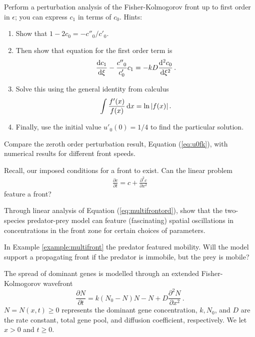 \begin{exerciseregion}

	\begin{exercise}
		Perform a perturbation analysis of the Fisher-Kolmogorov front up to first
		order in $\epsilon$; you can express $c_1$ in terms of $c_0$. Hints:
		\begin{enumerate}
			\item  Show that $1-2c_0=-c{''}_0/c{'}_0$. 
			\item Then show that equation for the 	first order term is
			\[
				\frac{\mathrm{d} c_1}{\mathrm{d} \xi} - \frac{c{''}_0}{c'_0}c_1 = -kD \frac{\mathrm{d}^2c_0}{\mathrm{d} \xi^2} \, .
			\]
		\item Solve this using the general identity from calculus
			\[
				\int \frac{f'(x)}{f(x)} \, \mathrm{d} x = \ln|f(x)| \, .
			\]
		\item Finally, use the initial value $u'_0(0)=1/4$ to find the particular solution.
		\end{enumerate}
	\end{exercise}

	\begin{exercise} \label{ex:checku0}
		Compare the zeroth order perturbation result, Equation (\ref{eq:u0fk}), with
		numerical results for different front speeds. 
	\end{exercise}

	\begin{exercise}	
		Recall, our imposed conditions for a front to exist. Can the linear problem
		\begin{eqnarray}
			\frac{\partial c}{\partial t}= c + \frac{\partial^2c}{\partial x^2}
		\end{eqnarray}
		feature a front? 
	\end{exercise}
	
	\begin{exercise}
		Through linear analysis of Equation (\ref{eq:multifrontord}), show that the two-species 
		predator-prey model can feature (fascinating) spatial oscillations in concentrations in the 
		front zone for certain choices of parameters.
	\end{exercise}

	\begin{exercise}
		In Example \ref{example:multifront}	the predator featured mobility. Will the model 
		support a propagating front if the predator is immobile, but the prey is mobile? 
	\end{exercise}

	\begin{exercise}
	  The spread of dominant genes is modelled through an extended 
	  Fisher-Kolmogorov wavefront
	  \begin{equation}
		\label{eq:efk}
		\frac{\partial N}{\partial t} = k(N_0-N)N - N + D
		\frac{\partial^2N}{\partial x^2} \, .
	  \end{equation}
	  $N=N(x,t) \geq 0$ represents the dominant gene concentration, $k, N_0$, and
	  $D$ are the rate constant, total gene pool, and diffusion coefficient,
	  respectively. We let $x > 0$ and $t \geq 0$.


\end{exercise}
\end{exerciseregion}
